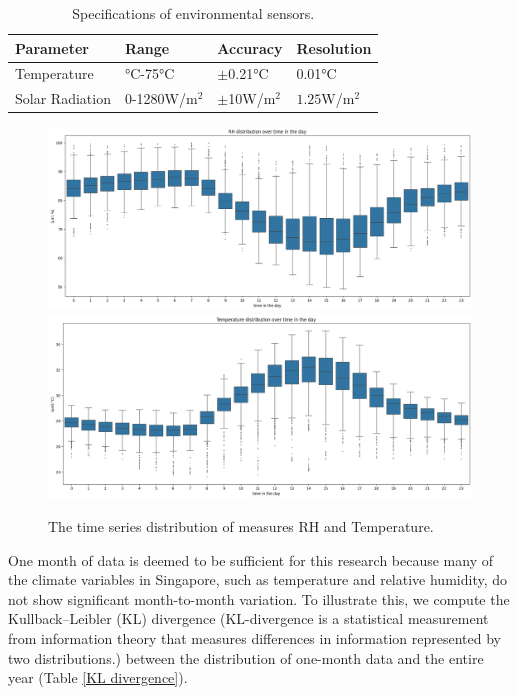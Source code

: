 \documentclass[a4paper,fleqn]{cas-sc}
\begin{document}
\begin{table}[width=.8\linewidth,cols=3,pos=h]
\caption{Specifications of environmental sensors.}\label{sensor}
\begin{tabular*}{\tblwidth}{@{} LLLL@{} }
\toprule
Parameter  & Range & Accuracy &Resolution\\
\midrule
Temperature&  °C-75°C & $\pm $0.21°C&0.01°C\\
Solar Radiation& 0-1280W/m$^2$ &$\pm$10W/m$^2$& $1.25$W/m$^2$\\
\bottomrule
\end{tabular*}
\end{table}


\begin{figure}
	\centering
	\includegraphics[scale=0.4]{figs/new_figs/rhboxplot.png}
 \includegraphics[scale=0.4]{figs/new_figs/temboxplot.png}
	\caption{The time series distribution of measures RH and Temperature.}
	\label{FIG:databoxplot}
\end{figure}


One month of data is deemed to be sufficient for this research because many of the climate variables in Singapore, such as temperature and relative humidity, do not show significant month-to-month variation. To illustrate this, we compute the Kullback–Leibler (KL) divergence (KL-divergence \citep{kullback1951information} is a statistical measurement from information theory that measures differences in information represented by two distributions.) between the distribution of one-month data and the entire year (Table \ref{KL divergence}). 
\end{document}
